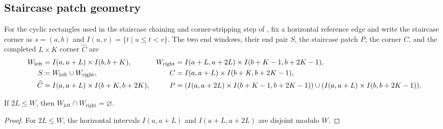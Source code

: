 \subsection{Staircase patch geometry}
\label{subsec:peps_torus_staircase_patch_geometry}

\begin{definition}
    \label{def:peps_horizontal_staircase_patch}
    \leanok
    For the cyclic rectangles used in the staircase chaining and
    corner-stripping step of
    \cite[proof sketch, lines~2320--2445]{Molnar2018NormalPEPS}, fix a
    horizontal reference edge and write the staircase corner as
    $s=(a,b)$ and $I(u,v)=\{t\mid u\le t<v\}$. The two end windows, their end
    pair $S$, the staircase patch $P$, the corner $C$, and the completed
    $L\times K$ corner $\widehat C$ are
    \begin{align}
        W_{\mathrm{left}}
                   & =I(a,a+L)\times I(b,b+K),
                   &
        W_{\mathrm{right}}
                   & =I(a+L,a+2L)\times I(b+K-1,b+2K-1),
        \notag                                                                           \\
        S          & =W_{\mathrm{left}}\cup W_{\mathrm{right}},
                   &
        C          & =I(a,a+L)\times I(b+K,b+2K-1),
        \notag                                                                           \\
        \widehat C & =I(a,a+L)\times I(b+K,b+2K),
                   &
        P          & =(I(a,a+2L)\times I(b+K-1,b+2K-1))\cup(I(a,a+L)\times I(b,b+2K-1)).
        \notag
    \end{align}
\end{definition}

\begin{lemma}
    \label{lem:peps_horizontal_staircase_end_pair_disjoint}
    \leanok
    If $2L\le W$, then $W_{\mathrm{left}}\cap W_{\mathrm{right}}=\varnothing$.
\end{lemma}
\begin{proof}
    \leanok
    For $2L\le W$, the horizontal intervals $I(a,a+L)$ and $I(a+L,a+2L)$ are
    disjoint modulo $W$.
\end{proof}

